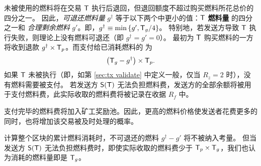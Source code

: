 未被使用的燃料将在交易 $\textsf{T}$ 执行后退回，但退回额度不超过购买燃料所花总价的四分之一。
因此，\emph{可退还燃料量} $g^{\dagger}$ 等于以下两个中更小的值：$\textsf{T}$ \textbf{燃料量} 的四分之一和 \emph{合理剩余燃料} $g'$。即，$g^{\dagger}\equiv \min{\left \{{g', \textsf{T}_g/4} \right \}}$。
特别地，若发送方导致 $\textsf{T}$ 执行失败，则理论上没有燃料可退还（即 $g^{\dagger} = g' = 0$）。
最初为 $\textsf{T}$ 购买燃料的一方将收到退款 $g^{\dagger}\times\textsf{T}_p$。而支付给已消耗燃料的 \coinsign 为
\begin{align}
	\left(\textsf{T}_g-g^{\dagger}\right)\times \textsf{T}_p.
\end{align}
如果 $\textsf{T}$ 未被执行（即，如第 \ref{sec:tx validate} 中定义一般，仅当 $R_z=2$ 时），没有燃料需要被支付。
若发送方 $\mathsf{S}{\left({\textsf{T}} \right)}$ 无法负担燃料费，发送方的全部余额将被用于支付燃料费，此实际收取的燃料费将被记录在收据 $R_f$ 中。


支付完毕的燃料费将加入矿工奖励池。因此，更高的燃料价格使发送者花费更多的同时，也将增加该交易被及时处理的概率。


计算整个区块的累计燃料消耗时，不可退还的燃料 $g^{\dagger} - g'$ 将不被纳入考量。
但当发送方 $\mathsf{S}{\left({\textsf{T}} \right)}$ 无法负担燃料费时，即使实际收取的燃料费少于 $\textsf{T}_p\times\textsf{T}_g$，我们也认为消耗的燃料量即是 $\textsf{T}_g$。

